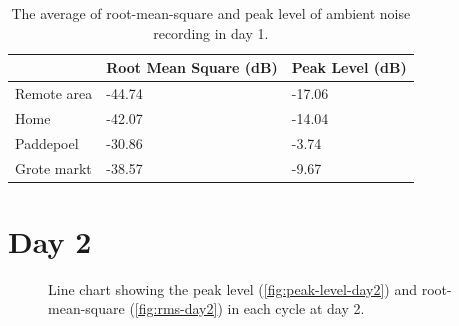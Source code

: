 \begin{table}[H]
\centering
\caption{The average of root-mean-square and peak level of ambient noise recording in day 1.}
\label{tab:ambient-noise-average-day1}
\begin{tabular}{lll} \toprule
            & Root Mean Square (dB) & Peak Level (dB) \\ \midrule
Remote area & -44.74                & -17.06          \\
Home        & -42.07                & -14.04           \\
Paddepoel   & -30.86                & -3.74          \\
Grote markt & -38.57              & -9.67        \\ \bottomrule
\end{tabular}
\end{table}




\section{Day 2} %
\label{sec:ambient-noise-day_2}
\begin{figure}[H]
	\begin{adjustwidth}{-3cm}{}
	\centering
	\end{adjustwidth}
	\caption{Line chart showing the peak level (\ref{fig:peak-level-day2}) and root-mean-square (\ref{fig:rms-day2}) in each cycle at day 2.}
	\label{fig:audio-result-day2}
\end{figure}

